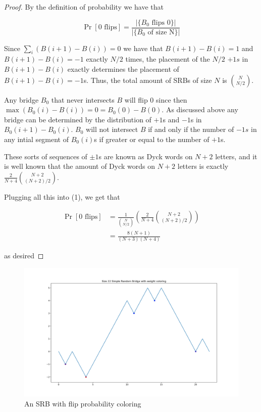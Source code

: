 \documentclass{article}
\theoremstyle{definition}
\begin{document}
\begin{proof} By the definition of probability we have that

\begin{equation}
\Pr[0\,\,\mathrm{flips}]=\frac{|\{B_0 \,\, \mathrm{flips\,\, }0\}|}{|\{B_0\,\,\mathrm{of\,\,size\,\,N}\}|}
\end{equation}

Since $\sum_i (B(i+1)-B(i))=0$ we have that $B(i+1)-B(i)=1$ and $B(i+1)-B(i)=-1$ exactly $N/2$ times, the placement of the $N/2$ $+1s$ in $B(i+1)-B(i)$ exactly determines the placement of $B(i+1)-B(i)=-1$s. Thus, the total amount of SRBs of size $N$ is ${N \choose N/2}$.

Any bridge $B_0$ that never intersects $B$ will flip $0$ since then $\max(B_0(i)-B(i))=0=B_0(0)-B(0)$. As discussed above any bridge can be determined by the distribution of $+1$s and $-1$s in $B_0(i+1)-B_0(i)$. $B_0$ will not intersect $B$ if and only if the number of $-1s$ in any intial segment of $B_0(i)$s if greater or equal to the number of $+1$s.

These sorts of sequences of $\pm1$s are known as Dyck words on $N+2$ letters, and it is well known that the amount of Dyck words on $N+2$ letters is exactly $\frac{2}{N+4}{N+2\choose (N+2)/2}$\cite{duchon2000enumeration}.

Plugging all this into (1), we get that

\begin{align*}
\Pr[0\,\,\mathrm{flips}]&=\frac{1}{{N \choose N/2}}\left(\frac{2}{N+4}{N+2\choose (N+2)/2}\right)\\
&=\frac{8(N+1)}{(N+3)(N+4)}
\end{align*}

as desired
\end{proof}

\begin{figure}[h!]
\caption{An SRB with flip probability coloring}
\centering
\includegraphics[width=\textwidth]{Figure_5}
\end{figure}
\end{document}

